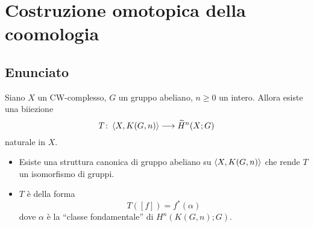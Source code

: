 \documentclass[9pt]{beamer}
\begin{document}
\section*{Costruzione omotopica della coomologia}
\subsection*{Enunciato}
\begin{frame*}
\begin{theorem}
Siano $X$ un CW-complesso, $G$ un gruppo abeliano, $n\ge 0$ un intero. Allora esiste una biiezione
\[
\map{T}{\hmaps{X,K(G,n)}}{\til{H}^n(X;G)}
\]
naturale in $X$.
\end{theorem}
\begin{itemize}
\item Esiste una struttura canonica di gruppo abeliano su $\left\langle X,K(G,n)\right\rangle$ che rende $T$ un isomorfismo di gruppi.
\item $T$ è della forma
\[
T([f])=f^*(\alpha)
\]
dove $\alpha$ è la ``classe fondamentale'' di $H^n(K(G,n);G)$.
\end{itemize}
\end{frame*}



\end{document}
